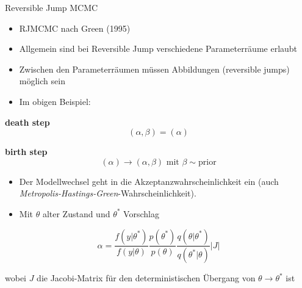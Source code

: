 \documentclass[ignorenonframetext,]{beamer}
\providecommand{\tightlist}{%
\setlength{\itemsep}{0pt}\setlength{\parskip}{0pt}}
\begin{document}
\begin{frame}[allowframebreaks]{Reversible Jump MCMC}

\begin{itemize}
\tightlist
\item
  RJMCMC nach Green (1995)
\item
  Allgemein sind bei Reversible Jump verschiedene Parameterräume erlaubt
\item
  Zwischen den Parameterräumen müssen Abbildungen (reversible jumps)
  möglich sein
\item
  Im obigen Beispiel:
\end{itemize}

\textbf{death step} \[ (\alpha,\beta) = (\alpha)\]

\textbf{birth step}
\[(\alpha) \to (\alpha,\beta) \text{ mit }\beta\sim \text{prior}\]

\begin{itemize}
\tightlist
\item
  Der Modellwechsel geht in die Akzeptanzwahrscheinlichkeit ein (auch
  \emph{Metropolis-Hastings-Green}-Wahrscheinlichkeit).
\item
  Mit \(\theta\) alter Zustand und \(\theta^*\) Vorschlag
\end{itemize}

\[
\alpha = \frac{f(y|\theta^*)}{f(y|\theta)}\frac{p(\theta^*)}{p(\theta)}
\frac{q(\theta|\theta^*)}{q(\theta^*|\theta)}\left|J\right|
\]

wobei \(J\) die Jacobi-Matrix für den deterministischen Übergang von
\(\theta \to \theta^*\) ist

\end{frame}
\end{document}
